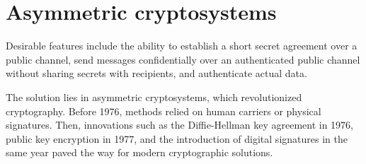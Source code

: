 \section{Asymmetric cryptosystems}

Desirable features include the ability to establish a short secret agreement over a public channel, send messages confidentially over an authenticated public channel without sharing secrets with recipients, and authenticate actual data.

The solution lies in asymmetric cryptosystems, which revolutionized cryptography. Before 1976, methods relied on human carriers or physical signatures. 
Then, innovations such as the Diffie-Hellman key agreement in 1976, public key encryption in 1977, and the introduction of digital signatures in the same year paved the way for modern cryptographic solutions.

